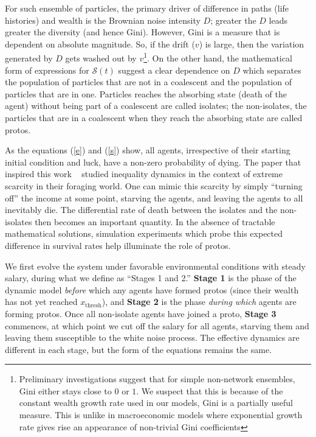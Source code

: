 For such ensemble of particles, the primary driver of difference in paths (life histories) and wealth is the Brownian noise intensity $D$; greater the $D$ leads greater the diversity (and hence Gini). However, Gini is a measure that is dependent on absolute magnitude. So, if the drift ($v$) is large, then the variation generated by
$D$ gets washed out by $v$\footnote{Preliminary investigations suggest that for simple non-network ensembles, Gini either stays close to $0$ or $1$. We suspect that this is because of the constant wealth growth rate used in our models, Gini is a partially useful measure. This is unlike in macroeconomic models where exponential growth rate gives rise an appearance of non-trivial Gini coefficients}.  On the other hand, the mathematical form of expressions for $\mathcal{S}(t)$ suggest a clear dependence on $D$ which separates the population of particles that are not in a coalescent and the population of particles that are in one. Particles reaches the absorbing state (death of the agent) without being part of a coalescent are called isolates; the non-isolates, the particles that are in a coalescent when they reach the absorbing state are called protos. 

As the equations (\ref{e}) and (\ref{s}) show, all agents, irrespective of their starting initial condition and luck, have a non-zero probability of dying. The paper that inspired this work ~\cite{srimil} studied inequality dynamics in the context of extreme scarcity in their foraging world. One can mimic this scarcity by simply ``turning off'' the income at some point, starving the agents, and leaving the agents to all inevitably die. The differential rate of death between the isolates and the non-isolates then becomes an important quantity. In the absence of tractable mathematical solutions, simulation experiments which probe this expected difference in survival rates help illuminate the role of protos. 

We first evolve the system under favorable environmental conditions with steady salary, during what we define as ``Stages 1 and 2.'' \textbf{Stage 1} is the phase of the dynamic model \textit{before} which any agents have formed protos (since their wealth has not yet reached $x_{\textrm{thresh}}$), and \textbf{Stage 2} is the phase \textit{during which} agents are forming protos. Once all non-isolate agents have joined a proto, \textbf{Stage 3} commences, at which point we cut off the salary for all agents, starving them and leaving them susceptible to the white noise process. The effective dynamics are different in each stage, but the form of the equations remains the same. 

